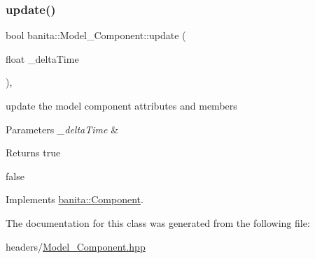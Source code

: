 \subsubsection{\texorpdfstring{update()}{update()}}
{\footnotesize\ttfamily bool banita\+::\+Model\+\_\+\+Component\+::update (\begin{DoxyParamCaption}\item[{float}]{\+\_\+delta\+Time }\end{DoxyParamCaption})\hspace{0.3cm}{\ttfamily [override]}, {\ttfamily [virtual]}}



update the model component attributes and members 


\begin{DoxyParams}{Parameters}
{\em \+\_\+delta\+Time} & \\
\hline
\end{DoxyParams}
\begin{DoxyReturn}{Returns}
true 

false 
\end{DoxyReturn}


Implements \mbox{\hyperlink{classbanita_1_1_component_ae8f9d11dc8e3c920d6d40146668c429b}{banita\+::\+Component}}.



The documentation for this class was generated from the following file\+:\begin{DoxyCompactItemize}
\item 
headers/\mbox{\hyperlink{_model___component_8hpp}{Model\+\_\+\+Component.\+hpp}}\end{DoxyCompactItemize}
